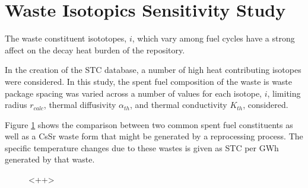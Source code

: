 \section{Waste Isotopics Sensitivity Study}\label{sec:isotopics}
The waste constituent isototopes, $i$, which vary among fuel cycles have a 
strong affect on the decay heat burden of the repository. 

In the creation of the \gls{STC} database, a number of high heat contributing 
isotopes were considered. In this study, the spent fuel composition of the 
waste is waste package spacing was varied across a number of values for each 
isotope, $i$, limiting radius $r_{calc}$, thermal diffusivity $\alpha_{th}$, 
and thermal conductivity $K_{th}$, considered.  

Figure \ref{fig:isotopics_sensitivity} shows the comparison between two common 
spent fuel constituents as well as a CsSr waste form that might be generated 
by a reprocessing process. The specific temperature changes due to these wastes 
is given as STC per GWh generated by that waste. 

\begin{figure}[htbp!]
\begin{center}
\end{center}
\caption[Thermal Sensitivity to Varying Waste Composition]{<++>}
\label{fig:isotopics_sensitivity}
\end{figure}



